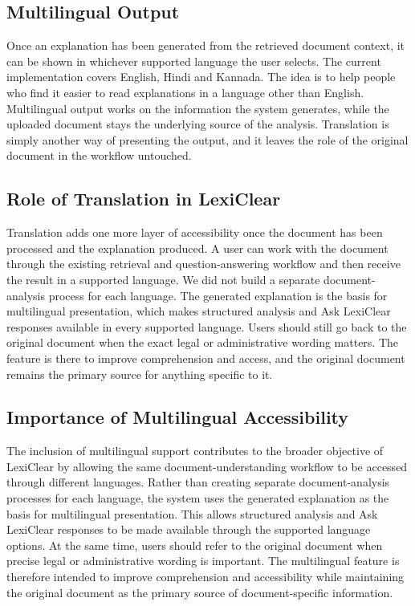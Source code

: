 \documentclass[12pt,a4paper,oneside]{report}
\begin{document}
\subsection{Multilingual Output}

Once an explanation has been generated from the retrieved document context, it can be shown in whichever supported language the user selects. The current implementation covers English, Hindi and Kannada. The idea is to help people who find it easier to read explanations in a language other than English. Multilingual output works on the information the system generates, while the uploaded document stays the underlying source of the analysis. Translation is simply another way of presenting the output, and it leaves the role of the original document in the workflow untouched.

\subsection{Role of Translation in LexiClear}

Translation adds one more layer of accessibility once the document has been processed and the explanation produced. A user can work with the document through the existing retrieval and question-answering workflow and then receive the result in a supported language. We did not build a separate document-analysis process for each language. The generated explanation is the basis for multilingual presentation, which makes structured analysis and Ask LexiClear responses available in every supported language. Users should still go back to the original document when the exact legal or administrative wording matters. The feature is there to improve comprehension and access, and the original document remains the primary source for anything specific to it.

\subsection{Importance of Multilingual Accessibility}

The inclusion of multilingual support contributes to the broader objective of
LexiClear by allowing the same document-understanding workflow to be accessed
through different languages. Rather than creating separate document-analysis
processes for each language, the system uses the generated explanation as the
basis for multilingual presentation. This allows structured analysis and
Ask LexiClear responses to be made available through the supported language
options. At the same time, users should refer to the original document when
precise legal or administrative wording is important. The multilingual
feature is therefore intended to improve comprehension and accessibility
while maintaining the original document as the primary source of
document-specific information.
\end{document}
